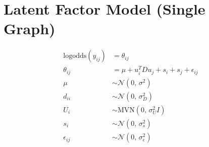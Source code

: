 \documentclass[11pt, oneside, fleqn]{article}   	%
\theoremstyle{plain}
\newcommand{\logodds}{\text{logodds}}
\newcommand{\normal}{\mathcal{N}}
\begin{document}

\section{Latent Factor Model (Single Graph)}
\begin{align*}
\logodds(y_{ij}) & = \theta_{ij} \\
\theta_{ij} & = \mu + u_i^T D u_j + s_i + s_j + \epsilon_{ij} \\
\mu & \sim \normal(0, \, \sigma^2) \\
d_{ii} & \sim \normal(0, \, \sigma_D^2) \\
U_i & \sim \text{MVN}(0, \, \sigma_U^2 I) \\
s_i & \sim \normal(0, \, \sigma_s^2) \\
\epsilon_{ij} & \sim \normal(0, \, \sigma_{\epsilon}^2) \\
\end{align*}
\end{document}
